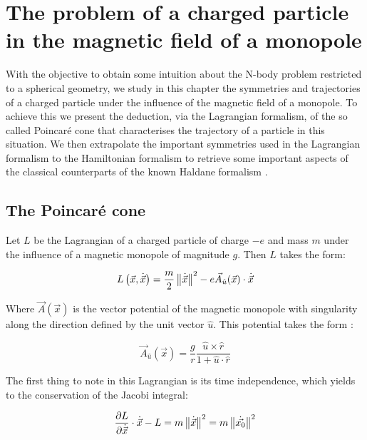 \chapter{The problem of a charged particle in the magnetic field of a monopole}

With the objective to obtain some intuition about the N-body problem restricted to a spherical geometry, we study in this chapter the symmetries and trajectories of a charged particle under the influence of the magnetic field of a monopole. To achieve this we present the deduction, via the Lagrangian formalism, of the so called Poincar\'e cone \cite{poincare} that characterises the trajectory of a particle in this situation. We then extrapolate the important symmetries used in the Lagrangian formalism to the Hamiltonian formalism to retrieve some important aspects of the classical counterparts of the known Haldane formalism \cite{haldane}.\\

\section{The Poincar\'e cone}
Let $L$ be the Lagrangian of a charged particle of charge $-e$ and mass $m$ under the influence of a magnetic monopole of magnitude $g$. Then $L$ takes the form:

\begin{equation}
L\left( \vec{x},\dot{\vec{x}} \right) = \frac{m}{2}\left\lVert \dot{\vec{x}} \right\rVert^2 - e\vec{A}_{\hat{u}}(\vec{x})\cdot\dot{\vec{x}}
\label{eq:lagrangian}
\end{equation}

Where $\vec{A}(\vec{x})$ is the vector potential of the magnetic monopole with singularity along the direction defined by the unit vector $\hat{u}$. This potential takes the form \cite{poincare}:

\begin{equation}
\vec{A}_{\hat{u}}(\vec{x}) = \frac{g}{r}\frac{\hat{u}\times\hat{r}}{1+\hat{u}\cdot\hat{r}}
\label{eq:monopolepotential}
\end{equation}

The first thing to note in this Lagrangian is its time independence, which yields to the conservation of the Jacobi integral:

\begin{equation*}
 \frac{\partial L}{\partial\dot{\vec{x}}}\cdot\dot{\vec{x}} - L = m\left\lVert \dot{\vec{x}} \right\rVert^2                    =m\left\lVert \dot{\vec{x_0}} \right\rVert^2 
\end{equation*}

